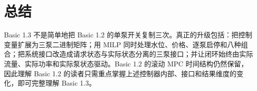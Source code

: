 \documentclass[UTF8,a4paper,11pt]{ctexart}
\begin{document}
\section{总结}

Basic 1.3 不是简单地把 Basic 1.2 的单泵开关复制三次。真正的升级包括：把控制变量扩展为三泵二进制矩阵；用 MILP 同时处理水位、价格、逐泵启停和八种组合；把系统接口改造成请求状态与实际状态分离的三泵接口；并让闭环始终由实际流量、实际功率和实际泵状态驱动。Basic 1.2 的滚动 MPC 时间结构仍然保留，因此理解 Basic 1.2 的读者只需重点掌握上述控制器内部、接口和结果维度的变化，即可完整理解 Basic 1.3。
\end{document}
